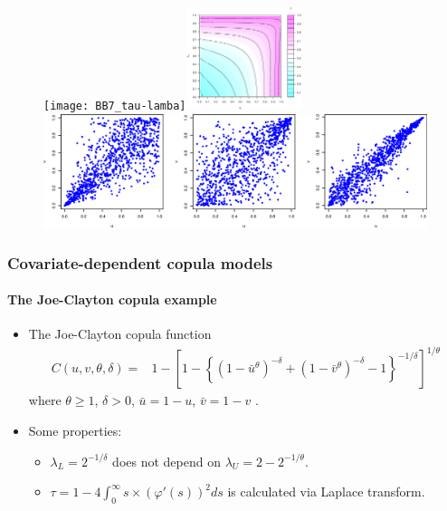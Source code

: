 \documentclass[10pt,aspectratio=169]{beamer}
\begin{document}
\begin{frame}[plain]
  \begin{figure}
    \centering
    \vspace{-0.35cm}
    \texttt{[image: BB7\_tau-lamba]}\includegraphics[width=0.3\textwidth]{tau-contour}\\
    \includegraphics[width=\textwidth]{BB7Scatter}
  \end{figure}
\end{frame}


\begin{frame}
  \frametitle{Covariate-dependent copula models}
  \framesubtitle{The Joe-Clayton copula example}
  \begin{itemize}
  \item The Joe-Clayton copula function
    \[
    \begin{split}
      C(u,v,\theta,\delta)=&1-\left[1-\left\{\left(1-\bar u ^{\theta }\right)^{-\delta
          }+\left(1-\bar v ^{\theta }\right)^{-\delta }-1\right\}^{-1/\delta
        }\right]^{1/\theta }
    \end{split}
    \]
    where $\theta \geq 1$, $\delta > 0$, $\bar u = 1-u$, $\bar v = 1-v$ .

  \item Some properties:
    \begin{itemize}

    \item $\lambda_L=2^{-1/\delta}$ does not depend on $\lambda_U=2-2^{-1/\theta}$.
    \item  $\tau=1- 4\int _0^{\infty} s\times(\varphi'(s))^2ds$ is calculated via Laplace transform.
    \end{itemize}
  \end{itemize}

\end{frame}
\end{document}
